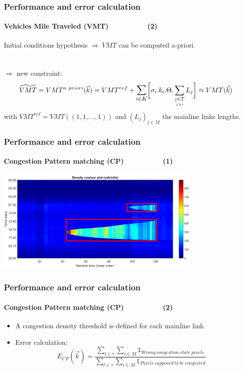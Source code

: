 \documentclass[fleqn]{beamer}
\begin{document}
\begin{frame}
	\frametitle{Performance and error calculation}
	\framesubtitle{Vehicles Mile Traveled (VMT)~~~~~~~~~~(2)}
		Initial conditions hypothesis $\Rightarrow\ VMT$ can be computed a-priori.\\
		~\\
		~\\
		$\Rightarrow$ new constraint:
		\begin{equation*}
		\widetilde{VMT}=VMT^{a\ priori}(\vec{k})=VMT^{ref}+\mathlarger{\sum\limits_{i\in K}}\biggl[\sigma_{i}.k_{i}.\Theta.	\sum\limits_{\underset{j>i}{j\in T}}L_{j}\biggr]\approx VMT(\vec{k})
		\end{equation*}
		with $VMT^{ref}=VMT((1,1,...,1))$ and $(L_{j})_{j\in M}$ the mainline links lengths.
\end{frame}

\begin{frame}
	\centering
	\frametitle{Performance and error calculation}
	\framesubtitle{Congestion Pattern matching (CP)~~~~~~~~~~(1)}
	\includegraphics[width=4in]{figures/beats_contour.png}
\end{frame}



\begin{frame}
	\frametitle{Performance and error calculation}
	\framesubtitle{Congestion Pattern matching (CP)~~~~~~~~~~(2)}
		\begin{itemize}
			\item A congestion density threshold is defined for each mainline link.
			\item Error calculation: 
				\begin{equation*}
					E_{CP}(\vec{k})=\frac{\sum_{t\in{\tau}}\sum_{i\in{M}}\mathds{1}_{Wrong\ congestion\ state\ pixels}}{\sum_{t\in{\tau}}\sum_{i\in{M}}\mathds{1}_{Pixels\ supposed\ to\ be\ congested}}
				\end{equation*}
		\end{itemize}
\end{frame}
\end{document}
